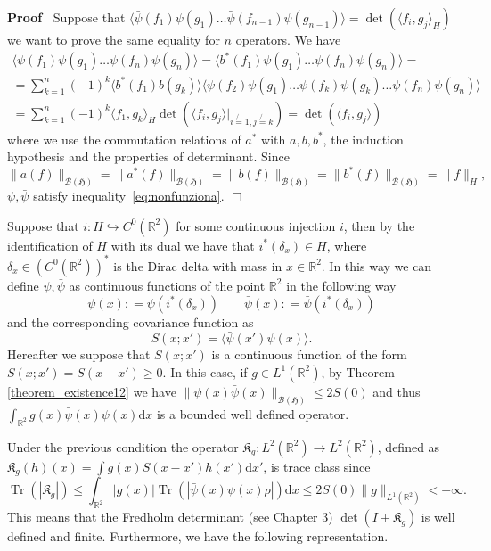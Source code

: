 \documentclass[a4paper,10pt]{article}
\newcommand{\asterisk}{\mathord{*}}
\newcommand{\mathd}{\mathrm{d}}
\newcommand{\tmop}[1]{\ensuremath{\operatorname{#1}}}
\newenvironment{proof}{\noindent\textbf{Proof\ }}{\hspace*{\fill}$\Box$\medskip}
\begin{document}
\begin{proof}
  Suppose that $\langle \bar{\psi} (f_1) \psi (g_1) \ldots \bar{\psi} (f_{n -
  1}) \psi (g_{n - 1}) \rangle = \det (\langle f_i, g_j \rangle_H)$ we want to
  prove the same equality for $n$ operators. We have
  \begin{multline*}
    \langle \bar{\psi} (f_1) \psi (g_1) \ldots \bar{\psi} (f_n) \psi (g_n)
    \rangle = \langle b^{\ast} (f_1) \psi (g_1) \ldots \bar{\psi} (f_n) \psi
    (g_n) \rangle =\\
    = \sum^n_{k = 1} (- 1)^k \langle b^{\ast} (f_1) b (g_k) \rangle \langle
    \bar{\psi} (f_2) \psi (g_1) \ldots \bar{\psi} (f_k) \psi (g_k) \ldots
    \bar{\psi} (f_n) \psi (g_n) \rangle\\
    = \sum^n_{k = 1} (- 1)^k \langle f_1, g_k \rangle_H \det \left( \langle
    f_i, g_j \rangle |_{i \not{=} 1, j \not{=} k} \right) = \det (\langle f_i,
    g_j \rangle)
  \end{multline*}
  where we use the commutation relations of $a^{\ast}$ with $a, b, b^{\ast}$,
  the induction hypothesis and the properties of determinant. Since
  \[ \| a (f) \|_{\mathcal{B} (\mathfrak{H})} = \| a^{\asterisk} (f)
     \|_{\mathcal{B} (\mathfrak{H})} = \| b (f) \|_{\mathcal{B}
     (\mathfrak{H})} = \| b^{\asterisk} (f) \|_{\mathcal{B} (\mathfrak{H})} =
     \| f \|_H, \]
  $\psi, \bar{\psi}$ satisfy inequality~{\eqref{eq:nonfunziona}}.
\end{proof}

Suppose that $i : H \hookrightarrow C^0 (\mathbb{R}^2)$ for some continuous
injection $i$, then by the identification of $H$ with its dual we have that
$i^{\ast} (\delta_x) \in H$, where $\delta_x \in (C^0 (\mathbb{R}^2))^{\ast}$
is the Dirac delta with mass in $x \in \mathbb{R}^2$. In this way we can
define $\psi, \bar{\psi}$ as continuous functions of the point $\mathbb{R}^2$
in the following way
\[ \psi (x) : = \psi (i^{\ast} (\delta_x)) \qquad \bar{\psi} (x) : =
   \bar{\psi} (i^{\ast} (\delta_x)) \]
and the corresponding covariance function as
\[ S (x ; x') = \langle \bar{\psi} (x') \psi (x) \rangle . \]
Hereafter we suppose that $S (x ; x')$ is a continuous function of the form $S
(x ; x') = S (x - x') \geqslant 0$. In this case, if $g \in L^1
(\mathbb{R}^2)$, by Theorem \ref{theorem_existence12} we have $\| \psi (x)
\bar{\psi} (x) \|_{\mathcal{B} (\mathfrak{H})} \leq 2 S (0)$ and thus
$\int_{\mathbb{R}^2} g (x) \bar{\psi} (x) \psi (x) \mathd x$ is a bounded well
defined operator.

Under the previous condition the operator $\mathfrak{K}_g : L^2 (\mathbb{R}^2)
\rightarrow L^2 (\mathbb{R}^2)$, defined as $\mathfrak{K}_g (h) (x) = \int g
(x) S (x - x') h (x') \mathd x'$, is trace class since
\[ \tmop{Tr} (| \mathfrak{K}_g |) \leq \int_{\mathbb{R}^2} | g (x) |
   \tmop{Tr} (| \bar{\psi} (x) \psi (x) \rho |) \mathd x \leq 2 S (0) \| g
   \|_{L^1 (\mathbb{R}^2)} < + \infty . \]
This means that the Fredholm determinant (see {\cite{Simon2005}} Chapter 3)
$\det (I + \mathfrak{K}_g)$ is well defined and finite. Furthermore, we have
the following representation.
\end{document}
